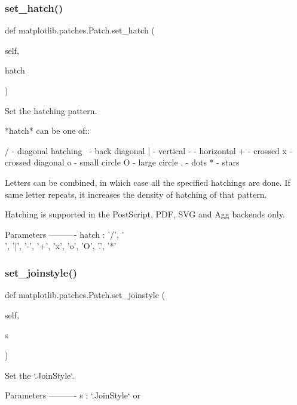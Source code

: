 \subsubsection{\texorpdfstring{set\+\_\+hatch()}{set\_hatch()}}
{\footnotesize\ttfamily def matplotlib.\+patches.\+Patch.\+set\+\_\+hatch (\begin{DoxyParamCaption}\item[{}]{self,  }\item[{}]{hatch }\end{DoxyParamCaption})}

\begin{DoxyVerb}Set the hatching pattern.

*hatch* can be one of::

  /   - diagonal hatching
  \   - back diagonal
  |   - vertical
  -   - horizontal
  +   - crossed
  x   - crossed diagonal
  o   - small circle
  O   - large circle
  .   - dots
  *   - stars

Letters can be combined, in which case all the specified
hatchings are done.  If same letter repeats, it increases the
density of hatching of that pattern.

Hatching is supported in the PostScript, PDF, SVG and Agg
backends only.

Parameters
----------
hatch : {'/', '\\', '|', '-', '+', 'x', 'o', 'O', '.', '*'}
\end{DoxyVerb}
 \mbox{\label{classmatplotlib_1_1patches_1_1Patch_a68b7a8290643067d2d3cd08346992671}} 
\subsubsection{\texorpdfstring{set\+\_\+joinstyle()}{set\_joinstyle()}}
{\footnotesize\ttfamily def matplotlib.\+patches.\+Patch.\+set\+\_\+joinstyle (\begin{DoxyParamCaption}\item[{}]{self,  }\item[{}]{s }\end{DoxyParamCaption})}

\begin{DoxyVerb}Set the `.JoinStyle`.

Parameters
----------
s : `.JoinStyle` or %
\end{DoxyVerb}
 \mbox{\label{classmatplotlib_1_1patches_1_1Patch_a71a1b34b00b9744766c34716f47c67d9}} 
